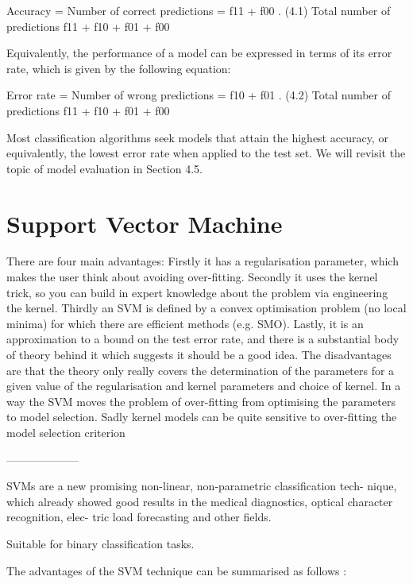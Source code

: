 Accuracy = Number of correct predictions = f11 + f00 . (4.1) Total number of predictions f11 + f10 + f01 + f00

Equivalently, the performance of a model can be expressed in terms of its error rate, which is given by the following equation:

Error rate = Number of wrong predictions = f10 + f01 . (4.2) Total number of predictions f11 + f10 + f01 + f00

Most classification algorithms seek models that attain the highest accuracy, or equivalently, the lowest error rate when applied to the test set. We will revisit the topic of model evaluation in Section 4.5.

\section{Support Vector Machine}

There are four main advantages: Firstly it has a regularisation parameter, which makes the user think about avoiding over-fitting. Secondly it uses the kernel trick, so you can build in expert knowledge about the problem via engineering the kernel. Thirdly an SVM is defined by a convex optimisation problem (no local minima) for which there are efficient methods (e.g. SMO). Lastly, it is an approximation to a bound on the test error rate, and there is a substantial body of theory behind it which suggests it should be a good idea.
The disadvantages are that the theory only really covers the determination of the parameters for a given value of the regularisation and kernel parameters and choice of kernel. In a way the SVM moves the problem of over-fitting from optimising the parameters to model selection. Sadly kernel models can be quite sensitive to over-fitting the model selection criterion \cite{cawley2010over}

--------------------

SVMs are a new promising non-linear, non-parametric classification tech- nique, which already showed good results in the medical diagnostics, optical character recognition, elec- tric load forecasting and other fields.

Suitable for binary classification tasks.

The advantages of the SVM technique can be summarised as follows \cite{auria2008support}:

